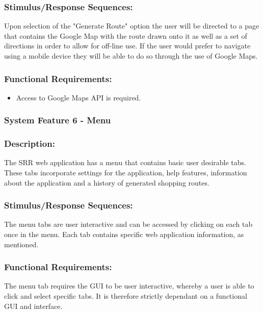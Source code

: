 \documentclass[10pt,twocolumn]{witseiepaper}
\begin{document}
		\subsubsection*{Stimulus/Response Sequences:}
		
		Upon selection of the "Generate Route" option the user will be directed to a page that contains the Google Map with the route drawn onto it as well as a set of directions in order to allow for off-line use. If the user would prefer to navigate using a mobile device they will be able to do so through the use of Google Maps.
		
		\subsubsection*{Functional Requirements:}
		
		\begin{itemize}
			\item Access to Google Maps API is required.
		\end{itemize}
		
		\subsubsection{System Feature 6 - Menu}
		
		\subsubsection*{Description:}
		
		The SRR web application has a menu that contains basic user desirable tabs. These tabs incorporate settings for the application, help features, information about the application and a history of generated shopping routes. 
		
		\subsubsection*{Stimulus/Response Sequences:}
		
		The menu tabs are user interactive and can be accessed by clicking on each tab once in the menu. Each tab contains specific web application information, as mentioned. 
		
		\subsubsection*{Functional Requirements:}
		
		The menu tab requires the GUI to be user interactive, whereby a user is able to click and select specific tabs. It is therefore strictly dependant on a functional GUI and interface.
		
\end{document}
